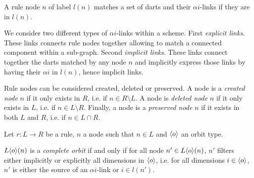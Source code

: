\documentclass[../main.tex]{subfiles}
\begin{document}
A rule node $n$ of label $l(n)$ matches a set of darts and their
$\alpha i$-links if they are in $l(n)$.

We consider two different types of $\alpha i$-links within a scheme. First
\emph{explicit links}. These links connects rule nodes together allowing to
match a connected component within a sub-graph. Second \emph{implicit links}.
These links connect together the darts matched by any node $n$ and implicitly
express those links by having their $\alpha i$ in $l(n)$, hence implicit links.

Rule nodes can be considered created, deleted or preserved. A node is a
\emph{created node} $n$ if it only exists in $R$, i.e. if $n \in R \setminus L$.
A node is \emph{deleted node} $n$ if it only exists in $L$, i.e. if
$n \in L \setminus R$. Finally, a node is a \emph{preserved node} $n$ if it
exists in both $L$ and $R$, i.e. if $n \in L \cap R$.

\begin{definition}
  Let $r : L \longrightarrow R$ be a rule, $n$ a node such that $n \in L$ and
  $\langle o\rangle$ an orbit type.

  $L\langle o\rangle(n)$ is a \emph{complete orbit} if and only if for all node
  $n'\in L\langle o\rangle(n)$, $n'$ filters either implicitly or explicitly all
  dimensions in $\langle o\rangle$, i.e. for all dimensions $i \in \langle o\rangle$, $n'$ is
  either the source of an $\alpha i$-link or $i \in l(n')$.

\end{definition}
\end{document}
